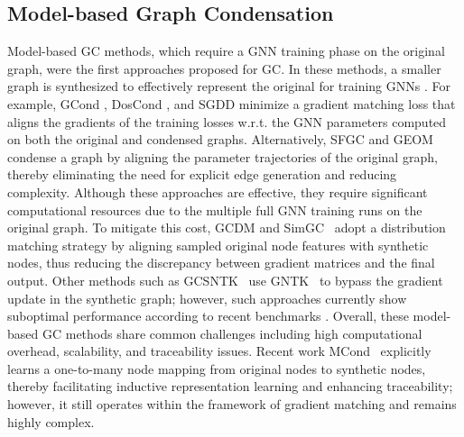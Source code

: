 \subsection{Model-based Graph Condensation}
Model-based GC methods, which require a GNN training phase on the original graph, were the first approaches proposed for GC. In these methods, a smaller graph is synthesized to effectively represent the original for training GNNs \citep{hashemi2024comprehensive}. For example, GCond \citep{jin2021graph}, DosCond \citep{jin2022condensing}, and SGDD \citep{yang2023does} minimize a gradient matching loss that aligns the gradients of the training losses w.r.t. the GNN parameters computed on both the original and condensed graphs. Alternatively, SFGC \citep{zheng2024structure} and GEOM \citep{geom} condense a graph by aligning the parameter trajectories of the original graph, thereby eliminating the need for explicit edge generation and reducing complexity. Although these approaches are effective, they require significant computational resources due to the multiple full GNN training runs on the original graph. To mitigate this cost, GCDM \citep{liu2022graph} and SimGC~\cite{xiao2024simple} adopt a distribution matching strategy by aligning sampled original node features with synthetic nodes, thus reducing the discrepancy between gradient matrices and the final output. Other methods such as GCSNTK~\cite{gcsntk} use GNTK~\cite{du2019gntk} to bypass the gradient update in the synthetic graph; however, such approaches currently show suboptimal performance according to recent benchmarks \citep{gong2024gc4nc,sun2024gc}. Overall, these model-based GC methods share common challenges including high computational overhead, scalability, and traceability issues. 
Recent work MCond~\cite{gao_graph_2023} explicitly learns a one-to-many node mapping from original nodes to synthetic nodes, thereby facilitating inductive representation learning and enhancing traceability; however, it still operates within the framework of gradient matching and remains highly complex.



